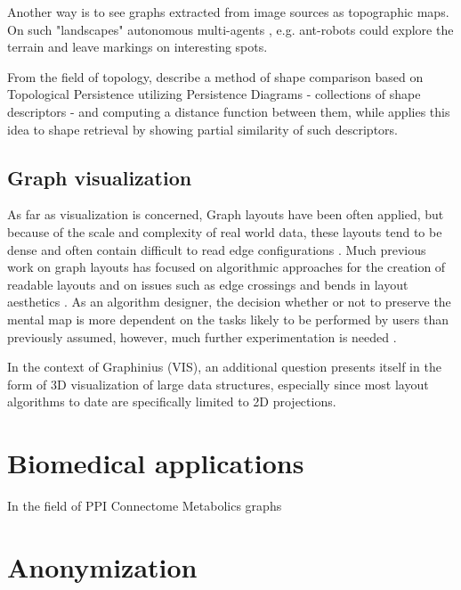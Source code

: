 		Another way is to see graphs extracted from image sources as topographic maps. On such "landscapes" autonomous multi-agents \citep{Kasaiezadeh2013MultiagentImage} \citep{Olfati-Saber2007MultiAgents}, e.g. ant-robots \citep{WagnerBruckstein2001FromAntsToAgents} could explore the terrain and leave markings on interesting spots.
		
		From the field of topology, \citep{Cerri2012} describe a method of shape comparison based on Topological Persistence utilizing Persistence Diagrams - collections of shape descriptors - and computing a distance function between them, while \citep{DiFabio2012} applies this idea to shape retrieval by showing partial similarity of such descriptors.
		
		\subsection{Graph visualization}
		\label{ssect:graph_visualization}
		
		As far as visualization is concerned, Graph layouts have been often applied, but because of the scale and complexity of real world data, these layouts tend to be dense and often contain difficult to read edge configurations \citep{HermanMelanconMarshall2000GraphVisIEEE}. Much previous work on graph layouts has focused on algorithmic approaches for the creation of readable layouts and on issues such as edge crossings and bends in layout aesthetics \citep{Purchase1997GraphDrawing}. As an algorithm designer, the decision whether or not to preserve the mental map is more dependent on the tasks likely to be performed by users than previously assumed, however, much further experimentation is needed \citep{ArchambaultPurchase2013MentalMap, StahlGabrys2013GraphbasedKDD}.
		
		In the context of Graphinius (VIS), an additional question presents itself in the form of 3D visualization of large data structures, especially since most layout algorithms to date are specifically limited to 2D projections.
		
		
	\section{Biomedical applications}
	\label{sect:app_biomed}
	
	In the field of 
	PPI
	Connectome
	Metabolics graphs
	
	
	
	
	
	\section{Anonymization}
	\label{sect:app_snonymization}
	
